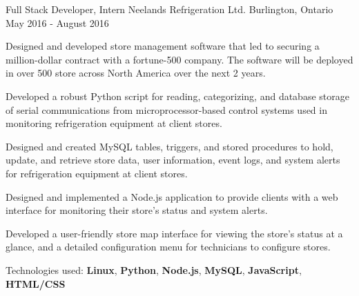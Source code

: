 \begin{cventries}
  \cventry
    {Full Stack Developer, Intern}
    {Neelands Refrigeration Ltd.}
    {Burlington, Ontario}
    {May 2016 - August 2016}
    {
      \begin{cvitems}
        \item {Designed and developed store management software that led to securing a million-dollar contract with a fortune-500 company. The software will be deployed in over 500 store across North America over the next 2 years.}
        \item {Developed a robust Python script for reading, categorizing, and database storage of serial communications from microprocessor-based control systems used in monitoring refrigeration equipment at client stores.}
        \item {Designed and created MySQL tables, triggers, and stored procedures to hold, update, and retrieve store data, user information, event logs, and system alerts for refrigeration equipment at client stores.}
        \item {Designed and implemented a Node.js application to provide clients with a web interface for monitoring their store's status and system alerts.}
        \item {Developed a user-friendly store map interface for viewing the store's status at a glance, and a detailed configuration menu for technicians to configure stores.}
        \item {Technologies used: \textbf{Linux}, \textbf{Python}, \textbf{Node.js}, \textbf{MySQL}, \textbf{JavaScript}, \textbf{HTML/CSS}}
      \end{cvitems}
    }
  
\end{cventries}
